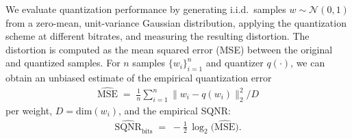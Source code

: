 \documentclass{article}
\theoremstyle{plain}
\theoremstyle{definition}
\theoremstyle{remark}
\begin{document}
\begin{table}[h]
\vspace{-0.5em}
\caption{Information retention at 2 bits/dim on Gaussian source.}
\vspace{0.1em}
\label{tab:gaussian_performance}
    \centering
{}
\end{table}
We evaluate quantization performance by generating i.i.d.\ samples $w \sim \mathcal{N}(0, 1)$ from a zero-mean, unit-variance Gaussian distribution, applying the quantization scheme at different bitrates, and measuring the resulting distortion. The distortion is computed as the mean squared error (MSE) between the original and quantized samples. For $n$ samples $\{w_i\}_{i=1}^n$ and quantizer $q(\cdot)$, we can obtain an unbiased estimate of the empirical quantization error {\setlength{\abovedisplayskip}{2pt}
\setlength{\belowdisplayskip}{1pt}
\setlength{\abovedisplayshortskip}{0pt}
\setlength{\belowdisplayshortskip}{1pt} %
\setlength{\jot}{3pt} %
\begin{align}
\widehat{\text{MSE}} \;=\; \frac{1}{n}\sum_{i=1}^n \| w_i - q(w_i) \|^2_2 / D
\end{align}
per weight, $D = \text{dim}(w_i)$, and the empirical SQNR:
\begin{align}
\widehat{\text{SQNR}}_{\text{bits}}
\;=\; -\frac{1}{2}\,\log_2\!\big(\widehat{\text{MSE}}\big).
\end{align}
}
\end{document}
